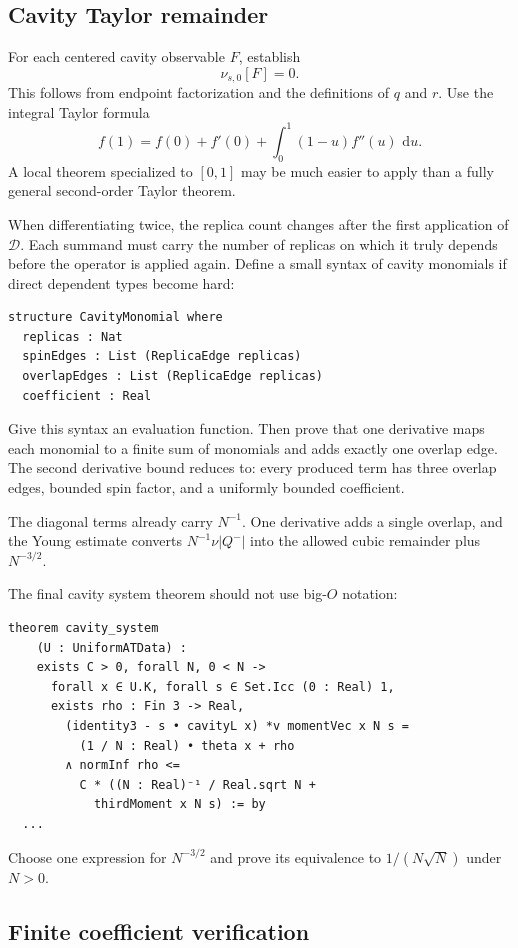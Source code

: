 \documentclass[11pt]{article}
\numberwithin{equation}{section}
\newcommand{\1}{\mathbf 1}
\newcommand{\dd}{\,\mathrm d}
\begin{document}
\subsection{Cavity Taylor remainder}

For each centered cavity observable $F$, establish
\[
 \nu_{s,0}[F]=0.
\]
This follows from endpoint factorization and the definitions of $q$ and $r$.
Use the integral Taylor formula
\[
 f(1)=f(0)+f'(0)+\int_0^1(1-u)f''(u)\,\dd u.
\]
A local theorem specialized to $[0,1]$ may be much easier to apply than a
fully general second-order Taylor theorem.

When differentiating twice, the replica count changes after the first
application of $\mathcal D$.  Each summand must carry the number of replicas
on which it truly depends before the operator is applied again.  Define a
small syntax of cavity monomials if direct dependent types become hard:
\begin{lstlisting}
structure CavityMonomial where
  replicas : Nat
  spinEdges : List (ReplicaEdge replicas)
  overlapEdges : List (ReplicaEdge replicas)
  coefficient : Real
\end{lstlisting}
Give this syntax an evaluation function.  Then prove that one derivative
maps each monomial to a finite sum of monomials and adds exactly one overlap
edge.  The second derivative bound reduces to: every produced term has three
overlap edges, bounded spin factor, and a uniformly bounded coefficient.

The diagonal terms already carry $N^{-1}$.  One derivative adds a single
overlap, and the Young estimate converts
$N^{-1}\nu|Q^-|$ into the allowed cubic remainder plus $N^{-3/2}$.

The final cavity system theorem should not use big-$O$ notation:
\begin{lstlisting}
theorem cavity_system
    (U : UniformATData) :
    exists C > 0, forall N, 0 < N ->
      forall x ∈ U.K, forall s ∈ Set.Icc (0 : Real) 1,
      exists rho : Fin 3 -> Real,
        (identity3 - s • cavityL x) *v momentVec x N s =
          (1 / N : Real) • theta x + rho
        ∧ normInf rho <=
          C * ((N : Real)⁻¹ / Real.sqrt N +
            thirdMoment x N s) := by
  ...
\end{lstlisting}
Choose one expression for $N^{-3/2}$ and prove its equivalence to
$1/(N\sqrt N)$ under $N>0$.

\subsection{Finite coefficient verification}
\end{document}
